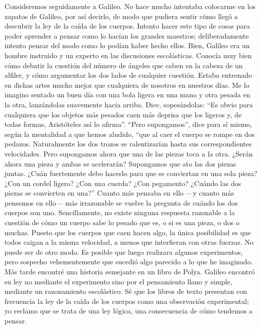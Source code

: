 \documentclass[a4paper, 12pt]{article}
\begin{document}
Consideremos seguidamente a Galileo. No hace mucho intentaba colocarme en los zapatos de Galileo, por así decirlo, de modo que pudiera sentir cómo llegó a descubrir la ley de la caída de los cuerpos. Intento hacer este tipo de cosas para poder aprender a pensar como lo hacían los grandes maestros; deliberadamente intento pensar del modo como lo podían haber hecho ellos. Bien, Galileo era un hombre instruido y un experto en las discusiones escolásticas. Conocía muy bien cómo debatir la cuestión del número de ángeles que caben en la cabeza de un alfiler, y cómo argumentar los dos lados de cualquier cuestión. Estaba entrenado en dichas artes mucho mejor que cualquiera de nosotros en nuestros días. Me lo imagino sentado un buen día con una bola ligera en una mano y otra pesada en la otra, lanzándolas suavemente hacia arriba. Dice, sopesándolas: ``Es obvio para cualquiera que los objetos más pesados caen más deprisa que los ligeros y, de todas formas, Aristóteles así lo afirma''. ``Pero supongamos'', dice para sí mismo, según la mentalidad a que hemos aludido, ``que al caer el cuerpo se rompe en dos pedazos. Naturalmente los dos trozos se ralentizarían hasta sus correspondientes velocidades. Pero supongamos ahora que una de las piezas toca a la otra. ¿Serán ahora una pieza y ambas se acelerarán? Supongamos que ato las dos piezas juntas. ¿Cuán fuertemente debo hacerlo para que se conviertan en una sola pieza? ¿Con un cordel ligero? ¿Con una cuerda? ¿Con pegamento? ¿Cuándo las dos piezas se convierten en una?'' Cuanto más pensaba en ello ---y cuanto más pensemos en ello---  más irrazonable se vuelve la pregunta de cuándo los dos cuerpos son uno. Sencillamente, no existe ninguna respuesta razonable a la cuestión de cómo un cuerpo sabe lo pesado que es, o si es una pieza, o dos o muchas. Puesto que los cuerpos que caen hacen algo, la única posibilidad es que todos caigan a la misma velocidad, a menos que interfieran con otras fuerzas. No puede ser de otro modo. Es posible que luego realizara algunos experimentos, pero sospecho vehementemente que sucedió algo parecido a lo que he imaginado. Más tarde encontré una historia semejante en un libro de Polya. Galileo encontró su ley no mediante el experimento sino por el pensamiento llano y simple, mediante un razonamiento escolástico. Sé que los libros de texto presentan con frecuencia la ley de la caída de los cuerpos como una observación experimental; yo reclamo que se trata de una ley lógica, una consecuencia de cómo tendemos a pensar.

 
\end{document}
